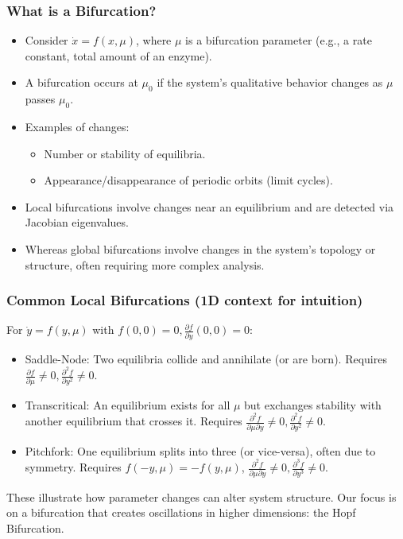 \documentclass[aspectratio=169]{beamer}
\begin{document}
\begin{frame}{\insertsectionhead}
	\frametitle{What is a Bifurcation?}
	\begin{itemize}
		\item Consider $\dot{x} = f(x, \mu)$, where $\mu$ is a \alert{bifurcation parameter} (e.g., a rate constant, total amount of an enzyme).
		\item A \alert{bifurcation} occurs at $\mu_0$ if the system's qualitative behavior changes as $\mu$ passes $\mu_0$.
		\item Examples of changes:
			\begin{itemize}
				\item Number or stability of equilibria.
				\item Appearance/disappearance of \alert{periodic orbits (limit cycles)}.
			\end{itemize}
		\item \alert{Local bifurcations} involve changes near an equilibrium and are detected via Jacobian eigenvalues.
		\item Whereas \alert{global bifurcations} involve changes in the system's topology or structure, often requiring more complex analysis.
	\end{itemize}
\end{frame}

\begin{frame}{\insertsectionhead}
	\frametitle{Common Local Bifurcations (1D context for intuition)}
	For $\dot{y} = f(y, \mu)$ with $f(0,0)=0, \frac{\partial f}{\partial y}(0,0)=0$:
	\begin{itemize}
		\item \alert{Saddle-Node}: Two equilibria collide and annihilate (or are born). Requires $\frac{\partial f}{\partial \mu} \neq 0, \frac{\partial^2 f}{\partial y^2} \neq 0$.
		\item \alert{Transcritical}: An equilibrium exists for all $\mu$ but exchanges stability with another equilibrium that crosses it. Requires $\frac{\partial^2 f}{\partial \mu \partial y} \neq 0, \frac{\partial^2 f}{\partial y^2} \neq 0$.
		\item \alert{Pitchfork}: One equilibrium splits into three (or vice-versa), often due to symmetry. Requires $f(-y,\mu)=-f(y,\mu)$, $\frac{\partial^2 f}{\partial \mu \partial y} \neq 0, \frac{\partial^3 f}{\partial y^3} \neq 0$.
	\end{itemize}
	These illustrate how parameter changes can alter system structure. Our focus is on a bifurcation that creates oscillations in higher dimensions: the Hopf Bifurcation.
\end{frame}
\end{document}
